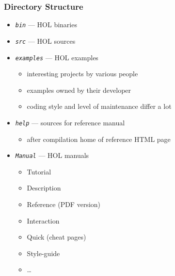 \begin{frame}
\frametitle{Directory Structure}
\begin{itemize}
\item \emph{\texttt{bin}} --- HOL binaries 
\item \emph{\texttt{src}} --- HOL sources
\item \emph{\texttt{examples}} --- HOL examples
\begin{itemize}
\item interesting projects by various people
\item examples owned by their developer
\item coding style and level of maintenance differ a lot
\end{itemize}
\item \emph{\texttt{help}} --- sources for reference manual
\begin{itemize}
\item after compilation home of reference HTML page
\end{itemize}
\item \emph{\texttt{Manual}} --- HOL manuals
\begin{itemize}
\item Tutorial
\item Description
\item Reference (PDF version)
\item Interaction
\item Quick (cheat pages)
\item Style-guide
\item \ldots
\end{itemize}
\end{itemize}
\end{frame}

